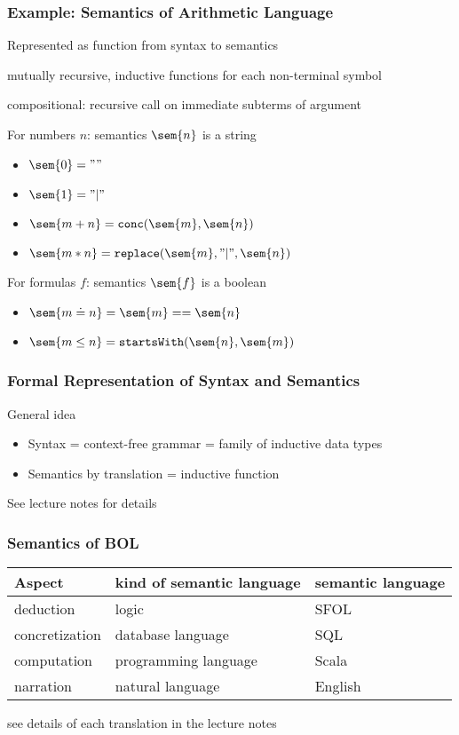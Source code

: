 \begin{frame}\frametitle{Example: Semantics of Arithmetic Language}
\begin{blockitems}{Represented as function from syntax to semantics}
\item mutually recursive, inductive functions for each non-terminal symbol
\item compositional: recursive call on immediate subterms of argument
\end{blockitems}

For numbers $n$: semantics $\sem{n}$ is a string
\begin{itemize}
\item $\sem{0}=""$
\item $\sem{1}="|"$
\item $\sem{m+n}=\cn{conc}(\sem{m},\sem{n})$
\item $\sem{m*n}=\cn{replace}(\sem{m},"|",\sem{n})$
\end{itemize}
\medskip

For formulas $f$: semantics $\sem{f}$ is a boolean
\begin{itemize}
\item $\sem{m\doteq n}=\sem{m}==\sem{n}$
\item $\sem{m\leq n}=\cn{startsWith}(\sem{n},\sem{m})$
\end{itemize}
\end{frame}

\begin{frame}\frametitle{Formal Representation of Syntax and Semantics}
General idea
\begin{itemize}
\item Syntax = context-free grammar = family of inductive data types
\item Semantics by translation = inductive function
\end{itemize}

See lecture notes for details
\end{frame}

\begin{frame}\frametitle{Semantics of BOL}
\begin{center}
\begin{tabular}{lll}
Aspect & kind of semantic language & semantic language\\
\hline 
deduction & logic & SFOL \\
concretization & database language & SQL \\
computation & programming language & Scala \\
narration & natural language & English \\
\end{tabular}
\end{center}

see details of each translation in the lecture notes
\end{frame}

